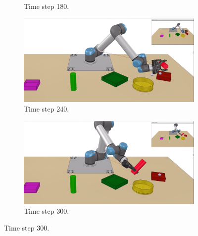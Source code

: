 \begin{figure}
\begin{subfigure}[t]{0.18\textwidth}
        \caption{Time step 180.}
    \end{subfigure}
    \begin{subfigure}[t]{0.18\textwidth}
        \includegraphics[width=\linewidth]{images/Language_Conditioned_Exp/theirs_4.png}
        \caption{Time step 240.}
    \end{subfigure}
    \begin{subfigure}[t]{0.18\textwidth}
        \includegraphics[width=\linewidth]{images/Language_Conditioned_Exp/theirs_5.png}
        \caption{Time step 300.}
    \end{subfigure}


\end{figure}
